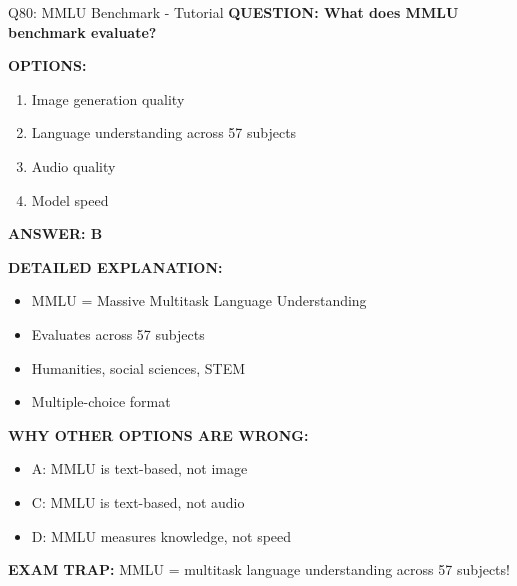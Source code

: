 \documentclass[8pt]{beamer}
\begin{document}
	\begin{frame}{Q80: MMLU Benchmark - Tutorial}
		\fontsize{6.5}{7.5}\selectfont
		\textbf{QUESTION: What does MMLU benchmark evaluate?}
		
		\vspace{0.1cm}
		\textbf{OPTIONS:}
		\begin{enumerate}
			\item Image generation quality
			\item Language understanding across 57 subjects
			\item Audio quality
			\item Model speed
		\end{enumerate}
		
		\vspace{0.1cm}
		\textcolor{myblue}{\textbf{ANSWER: B}}
		
		\vspace{0.1cm}
		\textbf{DETAILED EXPLANATION:}
		\begin{itemize}
			\item MMLU = Massive Multitask Language Understanding
			\item Evaluates across 57 subjects
			\item Humanities, social sciences, STEM
			\item Multiple-choice format
		\end{itemize}
		
		\vspace{0.1cm}
		\textcolor{myred}{\textbf{WHY OTHER OPTIONS ARE WRONG:}}
		\begin{itemize}
			\item \textcolor{myred}{A:} MMLU is text-based, not image
			\item \textcolor{myred}{C:} MMLU is text-based, not audio
			\item \textcolor{myred}{D:} MMLU measures knowledge, not speed
		\end{itemize}
		
		\textcolor{myred}{\textbf{EXAM TRAP:}} MMLU = \textcolor{myblue}{multitask language understanding} across 57 subjects!
	\end{frame}
	
\end{document}
